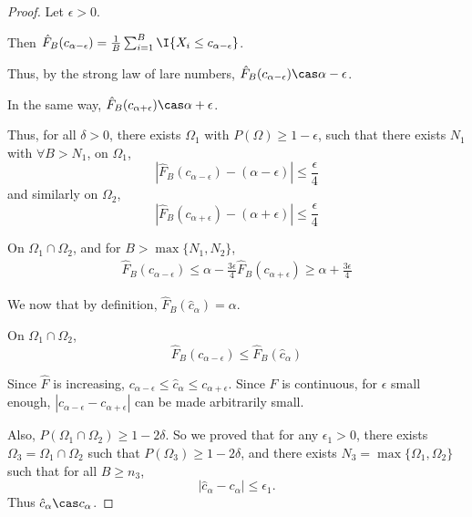 \begin{proof}
  Let $\epsilon > 0$.

  Then $\hat F_{B}(c_{\alpha - \epsilon}) = \frac{1}{B}
  \sum_{i=1}^{B} \I{X_{i} \leq c_{\alpha - \epsilon}}$.

  Thus, by the strong law of lare numbers, $\hat F_{B}(c_{\alpha -
    \epsilon}) \cas \alpha - \epsilon$.

  In the same way, $\hat F_{B}(c_{\alpha + \epsilon}) \cas \alpha +
  \epsilon$.

  Thus, for all $\delta > 0$, there exists $\Omega_{1}$ with $P(\Omega)
  \geq 1 - \epsilon$, such that there exists $N_{1}$ with $\forall B > N_{1}$,
  on $\Omega_{1}$,
  \begin{equation}
    |\hat F_{B}(c_{\alpha - \epsilon}) - (\alpha - \epsilon)| \leq \frac{\epsilon}{4} 
  \end{equation}
  and similarly on $\Omega_{2}$,
  \begin{equation}
    |\hat F_{B}(c_{\alpha + \epsilon}) - (\alpha + \epsilon)| \leq \frac{\epsilon}{4} 
  \end{equation}

  On $\Omega_{1} \cap \Omega_{2}$, and for $B > \max \{N_{1}, N_{2}
  \}$,
  \begin{align}
    \label{eq:71}
    \hat F_{B}(c_{\alpha - \epsilon}) \leq \alpha -
    \frac{3\epsilon}{4}
    \hat F_{B}(c_{\alpha + \epsilon}) \geq \alpha + \frac{3\epsilon}{4}
  \end{align}

  We now that by definition, $\hat F_{B}(\hat c_{\alpha}) = \alpha$.

  On $\Omega_{1} \cap \Omega_{2}$,
  \begin{equation}
    \label{eq:71}
    \hat F_{B}(c_{\alpha - \epsilon}) \leq \hat F_{B}(\hat c_{\alpha})
  \end{equation}

  Since $\hat F$ is increasing, $c_{\alpha - \epsilon} \leq \hat
  c_{\alpha} \leq c_{\alpha + \epsilon}$.  Since $F$ is continuous,
  for $\epsilon$ small enough, $|c_{\alpha - \epsilon} - c_{\alpha +
    \epsilon}|$ can be made arbitrarily small.

  Also, $P(\Omega_{1} \cap \Omega_{2}) \geq 1 - 2 \delta$.  So we
  proved that for any $\epsilon_{1} > 0$, there exists $\Omega_{3} =
  \Omega_{1} \cap \Omega_{2}$ such that $P(\Omega_{3}) \geq 1 - 2
  \delta$, and there exists $N_{3} = \max \{ \Omega_{1}, \Omega_{2}
  \}$ such that for all $B \geq n_{3}$,
  \begin{equation}
    \label{eq:71}
    |\hat c_{\alpha} - c_{\alpha}| \leq \epsilon_{1}.
  \end{equation}
  Thus $\hat c_{\alpha} \cas c_{\alpha}$.
\end{proof}



